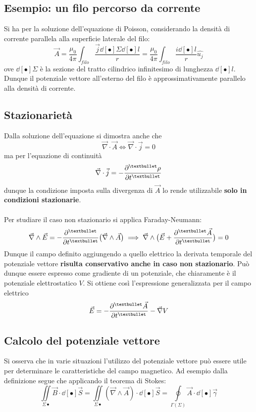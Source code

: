 \subsection{Esempio: un filo percorso da corrente}
Si ha per la soluzione dell'equazione di Poisson, considerando la densità di corrente parallela alla superficie laterale del filo:
\[\vec{A} = \frac{\mu_0}{4 \pi} \int_{filo} \frac{\vec{j} \dd[•]{\Sigma} \dd[•]{l}}{r} = \frac{\mu_0}{4 \pi} \int_{filo} \frac{i \dd[•]{l}}{r} \hat{u_j}\]
ove $\dd[•]{\Sigma}$ è la sezione del tratto cilindrico infinitesimo di lunghezza $\dd[•]{l}$. Dunque il potenziale vettore all'esterno del filo è approssimativamente parallelo alla densità di corrente.

\subsection{Stazionarietà}
Dalla soluzione dell'equazione si dimostra anche che
\[\vec{\nabla} \cdot \vec{A} \Leftrightarrow \vec{\nabla} \cdot \vec{j} = 0\]
ma per l'equazione di continuità
\[\vec{\nabla} \cdot \vec{j} = - \pdv[•]{\rho}{t}\]
dunque la condizione imposta sulla divergenza di $\vec{A}$ lo rende utilizzabile \textbf{solo in condizioni stazionarie}.
\\~\\Per studiare il caso non stazionario si applica Faraday-Neumann:
\[\vec{\nabla} \wedge \vec{E} = - \pdv[•]{}{t}\big(\vec{\nabla} \wedge \vec{A}\big) \implies \vec{\nabla} \wedge \big(\vec{E} + \pdv[•]{\vec{A}}{t}\big) = 0\]
Dunque il campo definito aggiungendo a quello elettrico la derivata temporale del potenziale vettore \textbf{risulta conservativo anche in caso non stazionario}. Può dunque essere espresso come gradiente di un potenziale, che chiaramente è il potenziale elettrostatico $V$. Si ottiene così l'espressione generalizzata per il campo elettrico
\[\vec{E} = - \pdv[•]{\vec{A}}{t} - \vec{\nabla}V\]

\subsection{Calcolo del potenziale vettore}
Si osserva che in varie situazioni l'utilizzo del potenziale vettore può essere utile per determinare le caratteristiche del campo magnetico. Ad esempio dalla definizione segue che applicando il teorema di Stokes:
\[\iint\limits_{\Sigma •} \vec{B} \cdot \dd[•]{\vec{S}} = \iint\limits_{\Sigma •} (\vec{\nabla} \wedge \vec{A}) \cdot \dd[•]{\vec{S}} = \oint\limits_{\Gamma(\Sigma)} \vec{A} \cdot \dd[•]{\vec{\gamma}}\]

